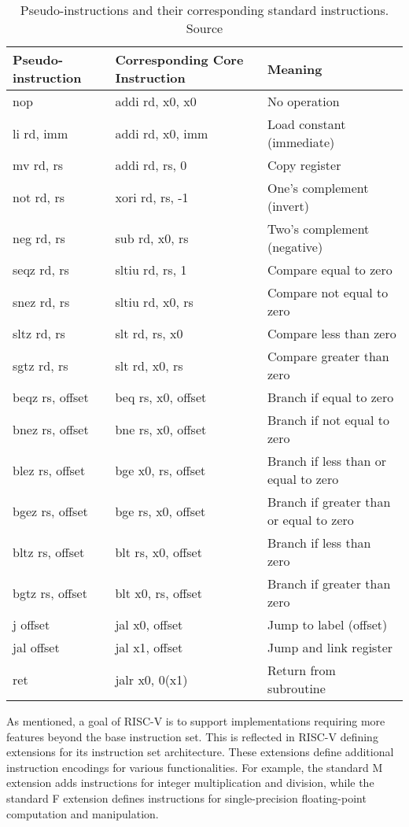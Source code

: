 \begin{table}[h!]
    \centering
    \caption{Pseudo-instructions and their corresponding standard instructions. Source \cite{riscv:manual:user:2024}}
    \label{tab:pseudo_instructions}
    \begin{tabular}{lll}
    \toprule
    \textbf{Pseudo-instruction} & \textbf{Corresponding Core Instruction} & \textbf{Meaning} \\
    \midrule
    nop & addi rd, x0, x0 & No operation \\
    li rd, imm & addi rd, x0, imm & Load constant (immediate) \\
    mv rd, rs & addi rd, rs, 0 & Copy register \\
    not rd, rs & xori rd, rs, -1 & One's complement (invert) \\
    neg rd, rs & sub rd, x0, rs & Two's complement (negative) \\
    seqz rd, rs & sltiu rd, rs, 1 & Compare equal to zero \\
    snez rd, rs & sltiu rd, x0, rs & Compare not equal to zero \\
    sltz rd, rs & slt rd, rs, x0 & Compare less than zero \\
    sgtz rd, rs & slt rd, x0, rs & Compare greater than zero \\
    beqz rs, offset & beq rs, x0, offset & Branch if equal to zero \\
    bnez rs, offset & bne rs, x0, offset & Branch if not equal to zero \\
    blez rs, offset & bge x0, rs, offset & Branch if less than or equal to zero \\
    bgez rs, offset & bge rs, x0, offset & Branch if greater than or equal to zero \\
    bltz rs, offset & blt rs, x0, offset & Branch if less than zero \\
    bgtz rs, offset & blt x0, rs, offset & Branch if greater than zero \\
    j offset & jal x0, offset & Jump to label (offset) \\
    jal offset & jal x1, offset & Jump and link register \\
    ret & jalr x0, 0(x1) & Return from subroutine \\
    \bottomrule
    \end{tabular}
\end{table}

As mentioned, a goal of RISC-V is to support implementations requiring more features beyond the base instruction set. This is reflected in RISC-V defining extensions \cite{riscv:manual:user:2024} for its instruction set architecture. These extensions define additional instruction encodings for various functionalities. For example, the standard M extension adds instructions for integer multiplication and division, while the standard F extension defines instructions for single-precision floating-point computation and manipulation.


